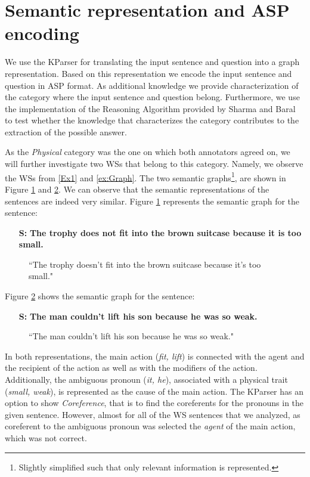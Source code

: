 \section{Semantic representation and ASP encoding}
We use the KParser for translating the input sentence and question into a graph representation. Based on this representation we encode the input sentence and question in ASP format. As additional knowledge we provide characterization of the category where the input sentence and question belong.
Furthermore, we use the implementation of the Reasoning Algorithm provided by Sharma and Baral \cite{2018CommonsenseKT} to test whether the knowledge that characterizes the category contributes to the extraction of the possible answer. 

As the \textit{Physical} category was the one on which both annotators agreed on, we will further investigate two WSs that belong to this category. Namely, we observe the WSs from \ref{Ex1} and \ref{ex:Graph}.
The two semantic graphs\footnote{Slightly simplified such that only relevant information is represented.}, are shown in Figure \ref{Graph1} and \ref{Graph2}. We can observe that the semantic representations of the sentences are indeed very similar. 
Figure \ref{Graph1} represents the semantic graph for the sentence:

\begin{itemize}
	\item[\textbf{S:}] \textbf{The trophy does not fit into the brown suitcase because it is too small.}
\end{itemize}
\begin{figure} [h!]
	\centering
	
	\caption{\label{Graph1}``The trophy doesn't fit into the brown suitcase because it's too small."}
\end{figure}


Figure \ref{Graph2} shows the semantic graph for the sentence:

\begin{itemize}
	\item[\textbf{S:}] \textbf{The man couldn't lift his son because he was so weak.}
\end{itemize} 


\begin{figure}[h!]
	\centering
	
	\caption{\label{Graph2}``The man couldn't lift his son because he was so weak."}
\end{figure}

In both representations, the main action (\textit{fit, lift}) is connected with the agent and the recipient of the action as well as with the modifiers of the action. Additionally, the ambiguous pronoun (\textit{it, he}),  associated with a physical trait (\textit{small, weak}), is represented as the cause of the main action. 
The KParser has an option to show \textit{Coreference}, that is to find the coreferents for the pronouns in the given sentence. However, almost for all of the WS sentences that we analyzed, as coreferent to the ambiguous pronoun was selected the \textit{agent} of the main action, which was not correct. 

